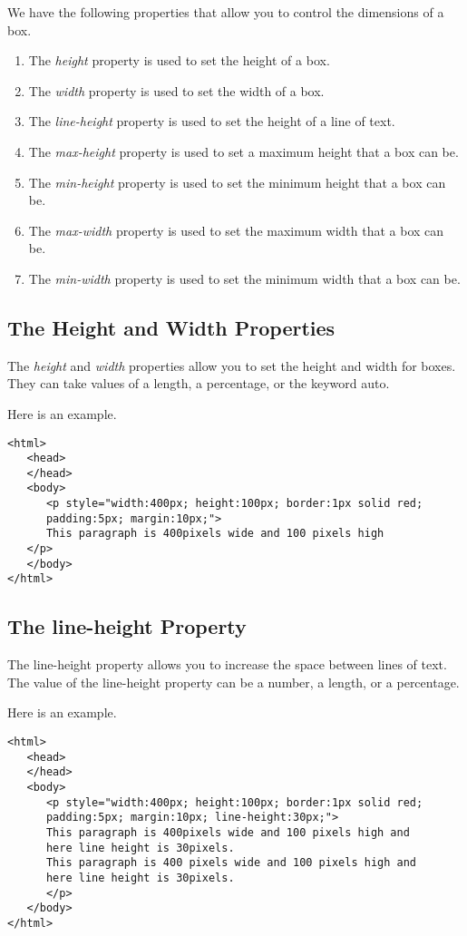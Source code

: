 \documentclass[a4paper,oneside]{book}
\numberwithin{equation}{chapter}
\begin{document}
We have the following properties that allow you to control the dimensions of a box.
\begin{enumerate}
\item The \textit{height} property is used to set the height of a box.
\item The \textit{width} property is used to set the width of a box.
\item The \textit{line-height} property is used to set the height of a line of text.
\item The \textit{max-height} property is used to set a maximum height that a box can be.
\item The \textit{min-height} property is used to set the minimum height that a box can be.
\item The \textit{max-width} property is used to set the maximum width that a box can be.
\item The \textit{min-width} property is used to set the minimum width that a box can be.
\end{enumerate}
\subsection{The Height and Width Properties}
The \textit{height} and \textit{width} properties allow you to set the height and width for boxes. They can take values of a length, a percentage, or the keyword auto.

Here is an example.
\begin{verbatim}
<html>
   <head>
   </head>
   <body>
      <p style="width:400px; height:100px; border:1px solid red; 
      padding:5px; margin:10px;">
      This paragraph is 400pixels wide and 100 pixels high
   </p>
   </body>
</html> 
\end{verbatim}
\subsection{The line-height Property}
The line-height property allows you to increase the space between lines of text. The value of the line-height property can be a number, a length, or a percentage.

Here is an example.
\begin{verbatim}
<html>
   <head>
   </head>
   <body>
      <p style="width:400px; height:100px; border:1px solid red; 
      padding:5px; margin:10px; line-height:30px;">
      This paragraph is 400pixels wide and 100 pixels high and
      here line height is 30pixels.
      This paragraph is 400 pixels wide and 100 pixels high and 
      here line height is 30pixels.
      </p>
   </body>
</html>
\end{verbatim}
\end{document}
